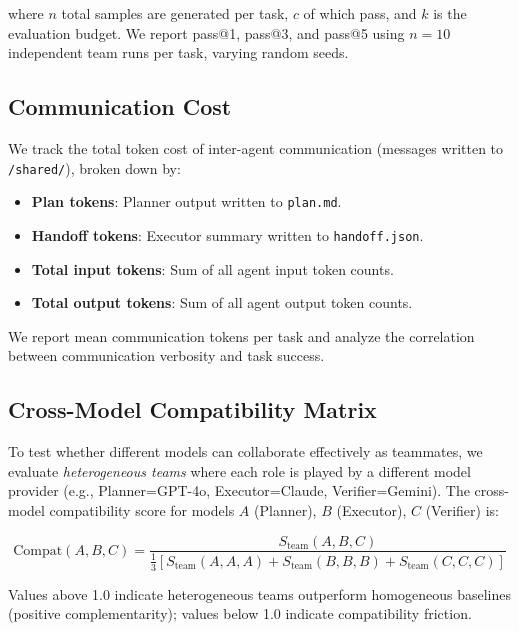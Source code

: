 \documentclass{article}
\newcommand{\sys}[1]{\texttt{#1}}
\begin{document}
where $n$ total samples are generated per task, $c$ of which pass, and $k$
is the evaluation budget. We report pass@1, pass@3, and pass@5 using
$n=10$ independent team runs per task, varying random seeds.

\subsection{Communication Cost}
\label{sec:metrics:cost}

We track the total token cost of inter-agent communication (messages
written to \sys{/shared/}), broken down by:
\begin{itemize}
  \item \textbf{Plan tokens}: Planner output written to \sys{plan.md}.
  \item \textbf{Handoff tokens}: Executor summary written to \sys{handoff.json}.
  \item \textbf{Total input tokens}: Sum of all agent input token counts.
  \item \textbf{Total output tokens}: Sum of all agent output token counts.
\end{itemize}

We report mean communication tokens per task and analyze the correlation
between communication verbosity and task success.

\subsection{Cross-Model Compatibility Matrix}
\label{sec:metrics:compat}

To test whether different models can collaborate effectively as teammates,
we evaluate \emph{heterogeneous teams} where each role is played by a
different model provider (e.g., Planner=GPT-4o, Executor=Claude, Verifier=Gemini).
The cross-model compatibility score for models $A$ (Planner), $B$ (Executor),
$C$ (Verifier) is:

\begin{equation}
  \text{Compat}(A,B,C) = \frac{S_{\text{team}}(A,B,C)}{
    \frac{1}{3}\left[S_{\text{team}}(A,A,A) + S_{\text{team}}(B,B,B)
    + S_{\text{team}}(C,C,C)\right]}
\end{equation}

Values above 1.0 indicate heterogeneous teams outperform homogeneous baselines
(positive complementarity); values below 1.0 indicate compatibility friction.

\end{document}
